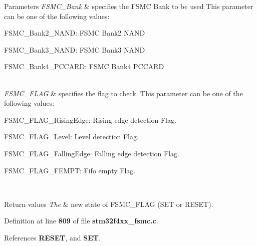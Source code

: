 \begin{DoxyParams}{Parameters}
{\em F\+S\+M\+C\+\_\+\+Bank} & specifies the F\+S\+MC Bank to be used This parameter can be one of the following values\+: \begin{DoxyItemize}
\item F\+S\+M\+C\+\_\+\+Bank2\+\_\+\+N\+A\+ND\+: F\+S\+MC Bank2 N\+A\+ND \item F\+S\+M\+C\+\_\+\+Bank3\+\_\+\+N\+A\+ND\+: F\+S\+MC Bank3 N\+A\+ND \item F\+S\+M\+C\+\_\+\+Bank4\+\_\+\+P\+C\+C\+A\+RD\+: F\+S\+MC Bank4 P\+C\+C\+A\+RD \end{DoxyItemize}
\\
\hline
{\em F\+S\+M\+C\+\_\+\+F\+L\+AG} & specifies the flag to check. This parameter can be one of the following values\+: \begin{DoxyItemize}
\item F\+S\+M\+C\+\_\+\+F\+L\+A\+G\+\_\+\+Rising\+Edge\+: Rising edge detection Flag. \item F\+S\+M\+C\+\_\+\+F\+L\+A\+G\+\_\+\+Level\+: Level detection Flag. \item F\+S\+M\+C\+\_\+\+F\+L\+A\+G\+\_\+\+Falling\+Edge\+: Falling edge detection Flag. \item F\+S\+M\+C\+\_\+\+F\+L\+A\+G\+\_\+\+F\+E\+M\+PT\+: Fifo empty Flag. \end{DoxyItemize}
\\
\hline
\end{DoxyParams}

\begin{DoxyRetVals}{Return values}
{\em The} & new state of F\+S\+M\+C\+\_\+\+F\+L\+AG (S\+ET or R\+E\+S\+ET). \\
\hline
\end{DoxyRetVals}


Definition at line \textbf{ 809} of file \textbf{ stm32f4xx\+\_\+fsmc.\+c}.



References \textbf{ R\+E\+S\+ET}, and \textbf{ S\+ET}.


